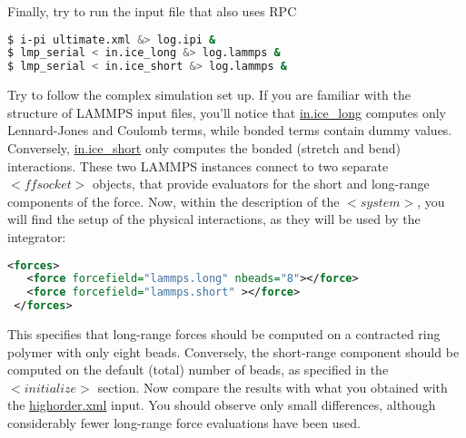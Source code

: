 \documentclass{article}
\begin{document}
\begin{Exercise}[label={sc-all},title={Doing PIMD Like a Pro}]
\Question Finally, try to run the input file that also uses RPC
\begin{lstlisting}[language=bash]
$ i-pi ultimate.xml &> log.ipi &
$ lmp_serial < in.ice_long &> log.lammps &
$ lmp_serial < in.ice_short &> log.lammps &
\end{lstlisting}%
Try to follow the complex simulation set up. If you are familiar with the structure
of LAMMPS input files, you'll notice that \url{in.ice_long} computes only
Lennard-Jones and Coulomb terms, while bonded terms contain dummy values.
Conversely, \url{in.ice_short} only computes the bonded (stretch and bend)
interactions. These two LAMMPS instances connect to two separate \lstinxml$<ffsocket>$
objects, that provide evaluators for the short and long-range components of
the force. Now, within the description of the \lstinxml$<system>$, you will
find the setup of the physical interactions, as they will be used by the 
integrator:
\begin{lstlisting}[language=xml]
 <forces>
   <force forcefield="lammps.long" nbeads="8"></force>
   <force forcefield="lammps.short" ></force>
 </forces>
\end{lstlisting}
This specifies that long-range forces should be 
computed on a contracted ring polymer with only eight beads. Conversely, 
the short-range component should be computed
on the default (total) number of beads, as specified in the \lstinxml$<initialize>$
section. 
Now compare the results with what you obtained with the \url{highorder.xml} 
input. You should observe only small differences, although considerably fewer
long-range force evaluations have been used. 

\end{Exercise}



\end{document}
